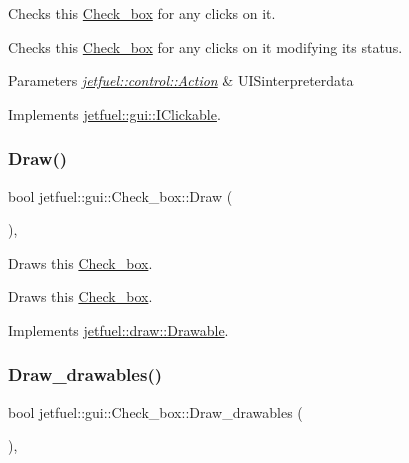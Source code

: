 Checks this \hyperlink{classjetfuel_1_1gui_1_1Check__box}{Check\+\_\+box} for any clicks on it. 

Checks this \hyperlink{classjetfuel_1_1gui_1_1Check__box}{Check\+\_\+box} for any clicks on it modifying it\textquotesingle{}s status.


\begin{DoxyParams}{Parameters}
{\em \hyperlink{structjetfuel_1_1control_1_1Action}{jetfuel\+::control\+::\+Action}} & U\+I\+Sinterpreterdata \\
\hline
\end{DoxyParams}


Implements \hyperlink{classjetfuel_1_1gui_1_1IClickable_aea45de37bd3beb7eb7e2e3056e4e37b3}{jetfuel\+::gui\+::\+I\+Clickable}.

\mbox{\label{classjetfuel_1_1gui_1_1Check__box_ad2ce6d4af8d950a4ef76b0688541c29a}} 
\subsubsection{\texorpdfstring{Draw()}{Draw()}}
{\footnotesize\ttfamily bool jetfuel\+::gui\+::\+Check\+\_\+box\+::\+Draw (\begin{DoxyParamCaption}{ }\end{DoxyParamCaption})\hspace{0.3cm}{\ttfamily [override]}, {\ttfamily [virtual]}}



Draws this \hyperlink{classjetfuel_1_1gui_1_1Check__box}{Check\+\_\+box}. 

Draws this \hyperlink{classjetfuel_1_1gui_1_1Check__box}{Check\+\_\+box}. 

Implements \hyperlink{classjetfuel_1_1draw_1_1Drawable_a1a072070322965ce9411ee6e7c311c56}{jetfuel\+::draw\+::\+Drawable}.

\mbox{\label{classjetfuel_1_1gui_1_1Check__box_a481eeb0f2c5c6f1165da4243ab5b636a}} 
\subsubsection{\texorpdfstring{Draw\+\_\+drawables()}{Draw\_drawables()}}
{\footnotesize\ttfamily bool jetfuel\+::gui\+::\+Check\+\_\+box\+::\+Draw\+\_\+drawables (\begin{DoxyParamCaption}{ }\end{DoxyParamCaption})\hspace{0.3cm}{\ttfamily [inline]}, {\ttfamily [protected]}}



